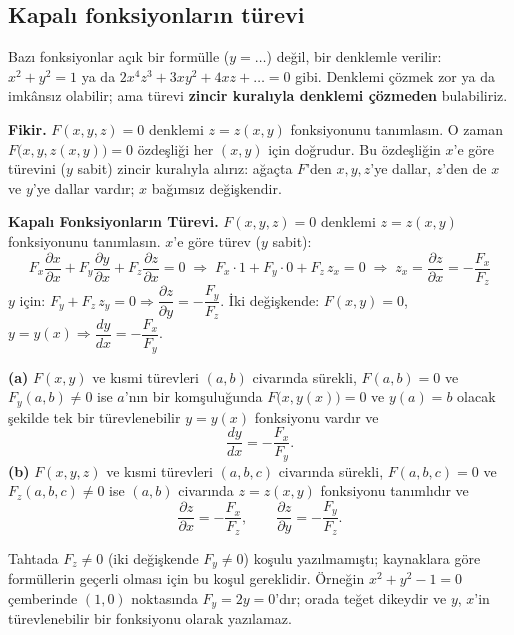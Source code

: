 \subsection{Kapalı fonksiyonların türevi}

Bazı fonksiyonlar açık bir formülle ($y=\dots$) değil, bir denklemle verilir: $x^2+y^2=1$ ya da
$2x^4z^3+3xy^2+4xz+\dots=0$ gibi. Denklemi çözmek zor ya da imkânsız olabilir; ama türevi \textbf{zincir kuralıyla
denklemi çözmeden} bulabiliriz.

\textbf{Fikir.} $F(x,y,z)=0$ denklemi $z=z(x,y)$ fonksiyonunu tanımlasın. O zaman $F\big(x,y,z(x,y)\big)=0$ özdeşliği
her $(x,y)$ için doğrudur. Bu özdeşliğin $x$'e göre türevini ($y$ sabit) zincir kuralıyla alırız: ağaçta $F$'den
$x,y,z$'ye dallar, $z$'den de $x$ ve $y$'ye dallar vardır; $x$ bağımsız değişkendir.

\begin{tahta}
\textbf{Kapalı Fonksiyonların Türevi.} $F(x,y,z)=0$ denklemi $z=z(x,y)$ fonksiyonunu tanımlasın. $x$'e göre türev ($y$ sabit):
\[
F_x\frac{\partial x}{\partial x}+F_y\frac{\partial y}{\partial x}+F_z\frac{\partial z}{\partial x}=0
\;\Rightarrow\;F_x\cdot1+F_y\cdot0+F_z\,z_x=0
\;\Rightarrow\;\boxed{z_x=\frac{\partial z}{\partial x}=-\frac{F_x}{F_z}}
\]
$y$ için: $F_y+F_z\,z_y=0\Rightarrow\boxed{\dfrac{\partial z}{\partial y}=-\dfrac{F_y}{F_z}}$.\quad
İki değişkende: $F(x,y)=0$, $y=y(x)\Rightarrow\dfrac{dy}{dx}=-\dfrac{F_x}{F_y}$.
\end{tahta}

\begin{teorem}
\textbf{(a)} $F(x,y)$ ve kısmi türevleri $(a,b)$ civarında sürekli, $F(a,b)=0$ ve $F_y(a,b)\ne0$ ise $a$'nın bir
komşuluğunda $F\big(x,y(x)\big)=0$ ve $y(a)=b$ olacak şekilde tek bir türevlenebilir $y=y(x)$ fonksiyonu vardır ve
\[
\frac{dy}{dx}=-\frac{F_x}{F_y}.
\]
\textbf{(b)} $F(x,y,z)$ ve kısmi türevleri $(a,b,c)$ civarında sürekli, $F(a,b,c)=0$ ve $F_z(a,b,c)\ne0$ ise $(a,b)$
civarında $z=z(x,y)$ fonksiyonu tanımlıdır ve
\[
\frac{\partial z}{\partial x}=-\frac{F_x}{F_z},\qquad \frac{\partial z}{\partial y}=-\frac{F_y}{F_z}.
\]
\end{teorem}

\begin{bilgi}
Tahtada $F_z\ne0$ (iki değişkende $F_y\ne0$) koşulu yazılmamıştı; kaynaklara göre formüllerin geçerli olması için bu
koşul gereklidir. Örneğin $x^2+y^2-1=0$ çemberinde $(1,0)$ noktasında $F_y=2y=0$'dır; orada teğet dikeydir ve $y$,
$x$'in türevlenebilir bir fonksiyonu olarak yazılamaz.
\end{bilgi}

